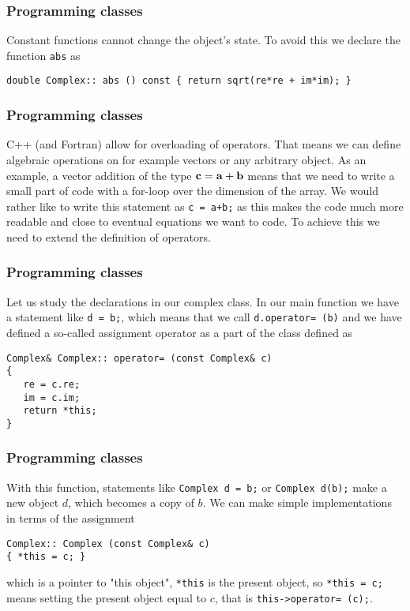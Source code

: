 \documentclass{beamer}
\begin{document}
\begin{frame}
\frametitle{Programming classes}

Constant functions cannot change the object's state.
To avoid this we declare the function \Verb!abs! as

\begin{verbatim}
double Complex:: abs () const { return sqrt(re*re + im*im); }
\end{verbatim}
\end{frame}

\begin{frame}
\frametitle{Programming classes}

C++ (and Fortran) allow for overloading of operators. That means we
can define algebraic operations on for example vectors or any
arbitrary object.  As an example, a vector addition of the type ${\bf
c} = {\bf a} + {\bf b}$ means that we need to write a small part of
code with a for-loop over the dimension of the array.  We would rather
like to write this statement as \Verb!c = a+b;! as this makes the code much
more readable and close to eventual equations we want to code.  To
achieve this we need to extend the definition of operators.
\end{frame}

\begin{frame}
\frametitle{Programming classes}

Let us study the declarations in our complex class.
In our main function we have a statement like \Verb!d = b;!, which means
that we call \Verb!d.operator= (b)! and we have defined a so-called assignment operator
as a part of the class defined as

\begin{verbatim}
Complex& Complex:: operator= (const Complex& c)
{
   re = c.re;
   im = c.im;
   return *this;
}
\end{verbatim}
\end{frame}

\begin{frame}
\frametitle{Programming classes}

With this function, statements like
\Verb!Complex d = b;! or \Verb!Complex d(b);!
make a new object $d$, which becomes a copy of $b$.
We can make simple implementations in terms of the assignment

\begin{verbatim}
Complex:: Complex (const Complex& c)
{ *this = c; }
\end{verbatim}
which  is a pointer to "this object", \Verb!*this! is the present object,
so \Verb!*this = c;! means setting the present object equal to $c$, that is
\Verb!this->operator= (c);!.
\end{frame}
\end{document}
